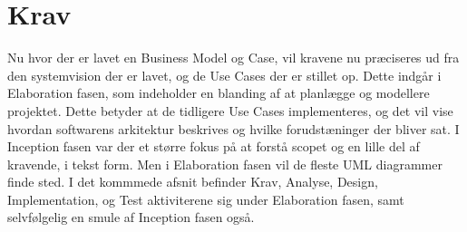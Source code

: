 \chapter{Krav}\label{ch:krav}
Nu hvor der er lavet en Business Model og Case, vil kravene nu præciseres ud fra den systemvision der er lavet, og de Use Cases der er stillet op. Dette indgår i Elaboration fasen, som indeholder en blanding af at planlægge og modellere projektet. Dette betyder at de tidligere Use Cases implementeres, og det vil vise hvordan softwarens arkitektur beskrives og hvilke forudstæninger der bliver sat. I Inception fasen var der et større fokus på at forstå scopet og en lille del af kravende, i tekst form. Men i Elaboration fasen vil de fleste UML diagrammer finde sted\cite{Larman2004}. I det kommmede afsnit befinder Krav, Analyse, Design, Implementation, og Test aktiviterene sig under Elaboration fasen, samt selvfølgelig en smule af Inception fasen også.
 


 
